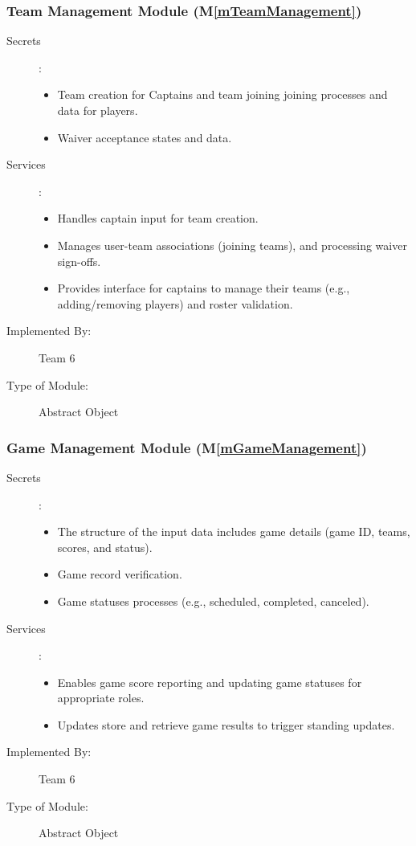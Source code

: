 \documentclass[12pt, titlepage]{article}
\newcommand{\mref}[1]{M\ref{#1}}
\begin{document}
\subsubsection{Team Management Module (\mref{mTeamManagement})}

\begin{description}
  \item[Secrets]:
        \begin{itemize}
          \item Team creation for Captains and team joining joining processes and data for players.
          \item Waiver acceptance states and data.
        \end{itemize}

  \item[Services]:
        \begin{itemize}
          \item Handles captain input for team creation.
          \item Manages user-team associations (joining teams), and processing waiver sign-offs.
          \item Provides interface for captains to manage their teams (e.g., adding/removing players) and roster validation.
        \end{itemize}

  \item[Implemented By:] Team 6

  \item[Type of Module:] Abstract Object
\end{description}

\subsubsection{Game Management Module (\mref{mGameManagement})}

\begin{description}
  \item[Secrets] :
        \begin{itemize}
          \item The structure of the input data includes game details (game ID, teams, scores, and status).
          \item Game record verification.
          \item Game statuses processes (e.g., scheduled, completed, canceled).
        \end{itemize}

  \item[Services]:
        \begin{itemize}
          \item Enables game score reporting and updating game statuses for appropriate roles.
          \item Updates store and retrieve game results to trigger standing updates.
        \end{itemize}
  \item[Implemented By:] Team 6

  \item[Type of Module:] Abstract Object
\end{description}
\end{document}
